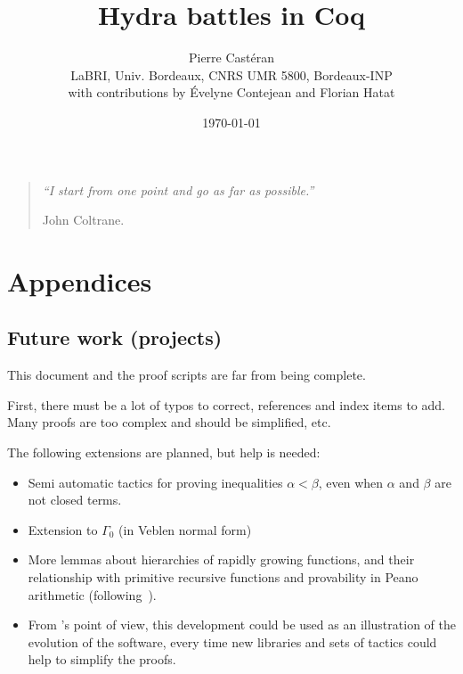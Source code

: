 \documentclass[a4paper]{book}
\author{Pierre Castéran\\ LaBRI, Univ. Bordeaux, CNRS UMR 5800, Bordeaux-INP\\with contributions by \'Evelyne Contejean and Florian Hatat}
\date{\today}
\title{Hydra battles in Coq}
\begin{document}
\maketitle




\cleardoublepage




\vspace{10cm}
\begin{quote} 
{ \Large {\it
``I start from one point and go as far as possible.'' } 

John Coltrane.}
\end{quote}

\tableofcontents
 










\chapter{Appendices}




\section{Future work (projects)}

This document and the proof scripts are far from being complete.

First, there must be a lot of typos to correct, references and index items to add. Many proofs are too complex and should be simplified, etc.

The following extensions are planned, but help is needed:

\begin{itemize}
\item Semi automatic tactics for proving inequalities $\alpha < \beta$, even when $\alpha$ and $\beta$ are not closed terms.
\item Extension to $\Gamma_0$ (in Veblen normal form)
\item More lemmas about hierarchies of rapidly growing functions, and their relationship 
    with primitive recursive functions and provability in Peano arithmetic 
(following~\cite{KS81, KP82}).
\item From \coq's point of view, this development could be used as an illustration of the evolution of the software, every time new libraries and sets of tactics could help to simplify the proofs.
\end{itemize}
\end{document}
